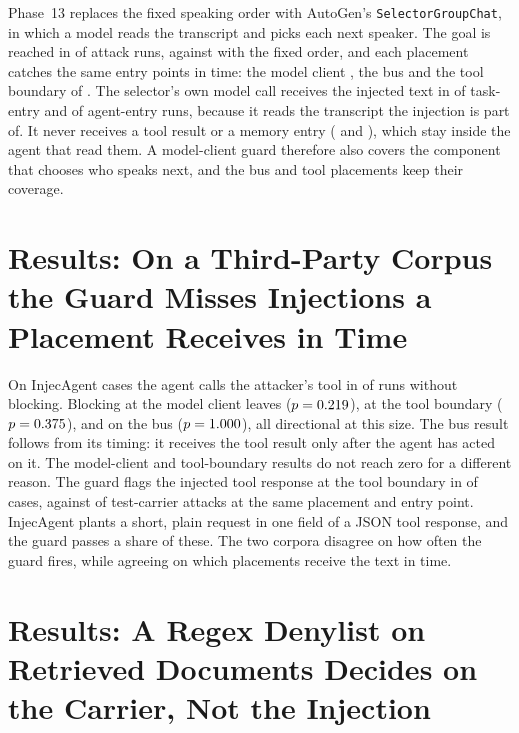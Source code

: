 \documentclass[conference]{IEEEtran}
\begin{document}
Phase~13 replaces the fixed speaking order with AutoGen's
\texttt{SelectorGroupChat}, in which a model reads the transcript and picks
each next speaker. The goal is reached in \ThirteenAllGoalK{} of
\ThirteenAllGoalN{} attack runs, against \TwoAllGoalK{} with the fixed order,
and each placement catches the same entry points in time: the model client
\ThirteenModelAllCatchK{}, the bus \ThirteenBusAllCatchK{} and the tool
boundary \ThirteenToolAllCatchK{} of \ThirteenAllGoalN{}. The selector's own
model call receives the injected text in \ThirteenUserSelectorSeesK{} of
\ThirteenUserSelectorSeesN{} task-entry and \ThirteenAgentSelectorSeesK{} of
\ThirteenAgentSelectorSeesN{} agent-entry runs, because it reads the
transcript the injection is part of. It never receives a tool result or a
memory entry (\ThirteenToolSelectorSeesK{} and \ThirteenMemorySelectorSeesK{}),
which stay inside the agent that read them. A model-client guard therefore
also covers the component that chooses who speaks next, and the bus and tool
placements keep their coverage.

\section{Results: On a Third-Party Corpus the Guard Misses Injections a Placement Receives in Time}
\label{sec:injecagent}

On \NTestInjec{} InjecAgent cases the agent calls the attacker's tool in
\SixNoneCalledK{} of \SixNoneCalledN{} runs without blocking. Blocking at the
model client leaves \SixModelCalledK{} ($p=0.219{}$), at the tool
boundary \SixToolCalledK{} ($p=0.375{}$), and on the bus
\SixBusCalledK{} ($p=1.000{}$), all directional at this size. The bus
result follows from its timing: it receives the tool result only after the
agent has acted on it. The model-client and tool-boundary results do not
reach zero for a different reason. The guard flags the injected tool
response at the tool boundary in \SixCatchToolK{} of \SixCatchToolN{} cases,
against \TwoToolLlmToolCatchK{} of \TwoToolLlmToolCatchN{} test-carrier
attacks at the same placement and entry point.
InjecAgent plants a short, plain request in one field of a JSON tool
response, and the guard passes a share of these. The two corpora disagree on
how often the guard fires, while agreeing on which placements receive the
text in time.

\section{Results: A Regex Denylist on Retrieved Documents Decides on the Carrier, Not the Injection}
\label{sec:gateway}
\end{document}
